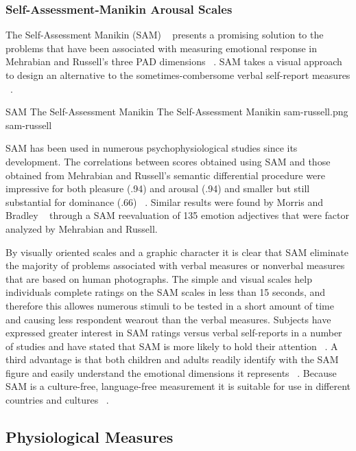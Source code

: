 \subsubsection{Self-Assessment-Manikin Arousal Scales}
The Self-Assessment Manikin (SAM) ~\cite{lang1985cognitive} presents a promising solution to the problems that have been associated with measuring emotional response in Mehrabian and Russell's three PAD dimensions ~\cite{russell1977evidence}. SAM takes a visual approach to design an alternative to the sometimes-combersome verbal self-report measures ~\cite{lang1985cognitive}.

\img
{SAM The Self-Assessment Manikin}
{The Self-Assessment Manikin}
{sam-russell.png}
{sam-russell}

SAM has been used in numerous psychophysiological studies since its development. The correlations between scores obtained using SAM and those obtained from Mehrabian and Russell's semantic differential procedure were impressive for both pleasure (.94) and arousal (.94) and smaller but still substantial for dominance (.66) ~\cite{lang1985cognitive}. Similar results were found by Morris and Bradley ~\cite{morris1995observations} through a SAM reevaluation of 135 emotion adjectives that were factor analyzed by Mehrabian and Russell.

By visually oriented scales and a graphic character it is clear that SAM eliminate the majority of problems associated with verbal measures or nonverbal measures that are based on human photographs. The simple and visual scales help individuals complete ratings on the SAM scales in less than 15 seconds, and therefore this allowes numerous stimuli to be tested in a short amount of time and causing less respondent wearout than the verbal measures. Subjects have expressed greater interest in SAM ratings versus verbal self-reports in a number of studies and have stated that SAM is more likely to hold their attention ~\cite{lang1985cognitive}. A third advantage is that both children and adults readily identify with the SAM figure and easily understand the emotional dimensions it represents ~\cite{lang1985cognitive}. Because SAM is a culture-free, language-free measurement it is suitable for use in different countries and cultures ~\cite{bradley1993affective}.


\subsection{Physiological Measures}

